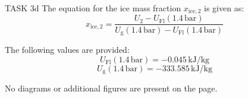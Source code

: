 TASK 3d  
The equation for the ice mass fraction \( x_{\text{ice},2} \) is given as:  
\[
x_{\text{ice},2} = \frac{U_2 - U_{\text{Fl}}(1.4 \, \text{bar})}{U_{\text{g}}(1.4 \, \text{bar}) - U_{\text{Fl}}(1.4 \, \text{bar})}
\]  

The following values are provided:  
\[
U_{\text{Fl}}(1.4 \, \text{bar}) = -0.045 \, \text{kJ/kg}
\]  
\[
U_{\text{g}}(1.4 \, \text{bar}) = -333.585 \, \text{kJ/kg}
\]  

No diagrams or additional figures are present on the page.